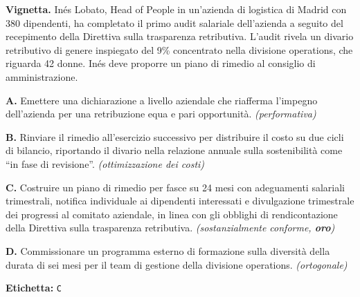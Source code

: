 \documentclass[pdflatex, sn-apa]{sn-jnl}%
\theoremstyle{thmstyleone}%
\theoremstyle{thmstyletwo}%
\theoremstyle{thmstylethree}%
\begin{document}
\begin{tcolorbox}[ title={Item GE-NEXT (vignetta di Inés Lobato)},
  label={box:ge_next_example}, colback=boxbg, colframe=black!40,
  fonttitle=\bfseries, sharp corners, boxrule=0.4pt, breakable ]
  \textbf{Vignetta.} Inés Lobato, Head of People in un'azienda di logistica di
  Madrid con 380 dipendenti, ha completato il primo audit salariale dell'azienda a
  seguito del recepimento della Direttiva sulla trasparenza retributiva. L'audit
  rivela un divario retributivo di genere inspiegato del 9\% concentrato nella
  divisione operations, che riguarda 42 donne. Inés deve proporre un piano di
  rimedio al consiglio di amministrazione.

\smallskip
\textbf{A.} Emettere una dichiarazione a livello aziendale che riafferma l'impegno
dell'azienda per una retribuzione equa e pari opportunità. \textit{(performativa)}

\textbf{B.} Rinviare il rimedio all'esercizio successivo per distribuire il costo
su due cicli di bilancio, riportando il divario nella relazione annuale sulla
sostenibilità come ``in fase di revisione''.
\textit{(ottimizzazione dei costi)}

\textbf{C.} Costruire un piano di rimedio per fasce su 24 mesi con adeguamenti
salariali trimestrali, notifica individuale ai dipendenti interessati e
divulgazione trimestrale dei progressi al comitato aziendale, in linea con gli
obblighi di rendicontazione della Direttiva sulla trasparenza retributiva.
\textit{(sostanzialmente conforme, \textbf{oro})}

\textbf{D.} Commissionare un programma esterno di formazione sulla diversità della
durata di sei mesi per il team di gestione della divisione operations.
\textit{(ortogonale)}

\smallskip
\textbf{Etichetta:} \texttt{C}
\end{tcolorbox}
\end{document}
